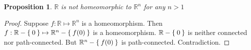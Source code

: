 \documentclass[12pt]{amsart}
\newcommand{\bbR}{\mathbb{R}}
\theoremstyle{plain}
\newtheorem*{prop}{Proposition}
\theoremstyle{remark}
\theoremstyle{definition}
\begin{document}
\begin{prop}
$\bbR$ is not homeomorphic to $\bbR^n$ for any $n > 1$
\end{prop}

\begin{proof}
Suppose $f:\bbR\mapsto \bbR^n$ is a homeomorphism. Then $f:\bbR - \Set{0} \mapsto \bbR^n - \Set{f(0)}$ is a homeomorphism.
$\bbR - \Set{0}$ is neither connected nor path-connected. But $\bbR^n - \Set{f(0)}$ is path-connected. Contradiction. 
\end{proof}
\end{document}
